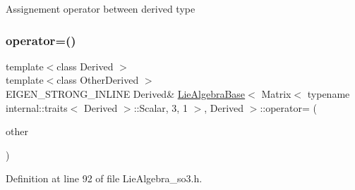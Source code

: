 Assignement operator between derived type \hypertarget{class_lie_algebra_base_3_01_matrix_3_01typename_01internal_1_1traits_3_01_derived_01_4_1_1_scalabfa0bdce6d9781ee940346c3f6d91f4e_a91c3f4ab0fef7eddac375d0909f47bf2}{}\label{class_lie_algebra_base_3_01_matrix_3_01typename_01internal_1_1traits_3_01_derived_01_4_1_1_scalabfa0bdce6d9781ee940346c3f6d91f4e_a91c3f4ab0fef7eddac375d0909f47bf2} 
\subsubsection{\texorpdfstring{operator=()}{operator=()}\hspace{0.1cm}{\footnotesize\ttfamily [3/4]}}
{\footnotesize\ttfamily template$<$class Derived $>$ \\
template$<$class Other\+Derived $>$ \\
E\+I\+G\+E\+N\+\_\+\+S\+T\+R\+O\+N\+G\+\_\+\+I\+N\+L\+I\+NE Derived\& \hyperlink{class_lie_algebra_base}{Lie\+Algebra\+Base}$<$ Matrix$<$ typename internal\+::traits$<$ Derived $>$\+::Scalar, 3, 1 $>$, Derived $>$\+::operator= (\begin{DoxyParamCaption}\item[{const Matrix\+Base$<$ Other\+Derived $>$ \&}]{other }\end{DoxyParamCaption})\hspace{0.3cm}{\ttfamily [inline]}}



Definition at line 92 of file Lie\+Algebra\+\_\+so3.\+h.

\hypertarget{class_lie_algebra_base_3_01_matrix_3_01typename_01internal_1_1traits_3_01_derived_01_4_1_1_scalabfa0bdce6d9781ee940346c3f6d91f4e_a71ba9feff1ba5b3337ad41a9537846f4}{}\label{class_lie_algebra_base_3_01_matrix_3_01typename_01internal_1_1traits_3_01_derived_01_4_1_1_scalabfa0bdce6d9781ee940346c3f6d91f4e_a71ba9feff1ba5b3337ad41a9537846f4} 
